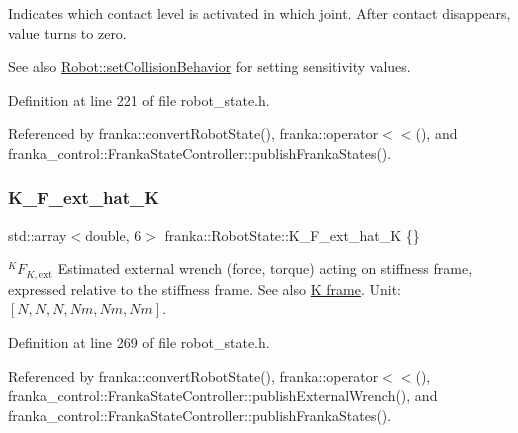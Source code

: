 Indicates which contact level is activated in which joint. After contact disappears, value turns to zero.

\begin{DoxySeeAlso}{See also}
\hyperlink{classfranka_1_1Robot_a168e1214ac36d74ac64f894332b84534}{Robot\+::set\+Collision\+Behavior} for setting sensitivity values. 
\end{DoxySeeAlso}


Definition at line 221 of file robot\+\_\+state.\+h.



Referenced by franka\+::convert\+Robot\+State(), franka\+::operator$<$$<$(), and franka\+\_\+control\+::\+Franka\+State\+Controller\+::publish\+Franka\+States().

\mbox{\label{structfranka_1_1RobotState_a96267d443c05fcc58d7ac32f63912649}} 
\subsubsection{\texorpdfstring{K\+\_\+\+F\+\_\+ext\+\_\+hat\+\_\+K}{K\_F\_ext\_hat\_K}}
{\footnotesize\ttfamily std\+::array$<$double, 6$>$ franka\+::\+Robot\+State\+::\+K\+\_\+\+F\+\_\+ext\+\_\+hat\+\_\+K \{\}}

$^{K}F_{K,\text{ext}}$ Estimated external wrench (force, torque) acting on stiffness frame, expressed relative to the stiffness frame. See also \hyperlink{classfranka_1_1Robot_k-frame}{K frame}. Unit\+: $[N,N,N,Nm,Nm,Nm]$. 

Definition at line 269 of file robot\+\_\+state.\+h.



Referenced by franka\+::convert\+Robot\+State(), franka\+::operator$<$$<$(), franka\+\_\+control\+::\+Franka\+State\+Controller\+::publish\+External\+Wrench(), and franka\+\_\+control\+::\+Franka\+State\+Controller\+::publish\+Franka\+States().

\mbox{\label{structfranka_1_1RobotState_a06d7019f85339409e932dc086b7a260b}} 
